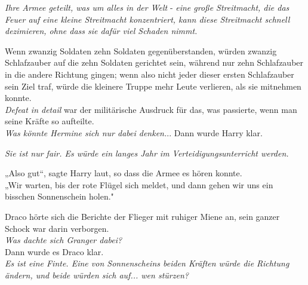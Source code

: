 {\emph{Ihre Armee geteilt, was um alles in der Welt} - \emph{eine große Streitmacht, die das Feuer auf eine kleine Streitmacht konzentriert, kann diese Streitmacht schnell dezimieren, ohne dass sie dafür viel Schaden nimmt.}

Wenn zwanzig Soldaten zehn Soldaten gegenüberstanden, würden zwanzig Schlafzauber auf die zehn Soldaten gerichtet sein, während nur zehn Schlafzauber in die andere Richtung gingen; wenn also nicht jeder dieser ersten Schlafzauber sein Ziel traf, würde die kleinere Truppe mehr Leute verlieren, als sie mitnehmen konnte.\\ \emph{Defeat in detail} war der militärische Ausdruck für das, was passierte, wenn man seine Kräfte so aufteilte.\\ \emph{Was könnte Hermine sich nur dabei denken.}.. Dann wurde Harry klar.

\emph{Sie ist nur fair. Es würde ein langes Jahr im Verteidigungsunterricht werden.}

„Also gut“, sagte Harry laut, so dass die Armee es hören konnte.\\ „Wir warten, bis der rote Flügel sich meldet, und dann gehen wir uns ein bisschen Sonnenschein holen."

Draco hörte sich die Berichte der Flieger mit ruhiger Miene an, sein ganzer Schock war darin verborgen.\\ \emph{Was dachte sich Granger dabei?}\\ Dann wurde es Draco klar.\\ \emph{Es ist eine Finte. Eine von Sonnenscheins beiden Kräften würde die Richtung ändern, und beide würden sich auf... wen stürzen?}

}
